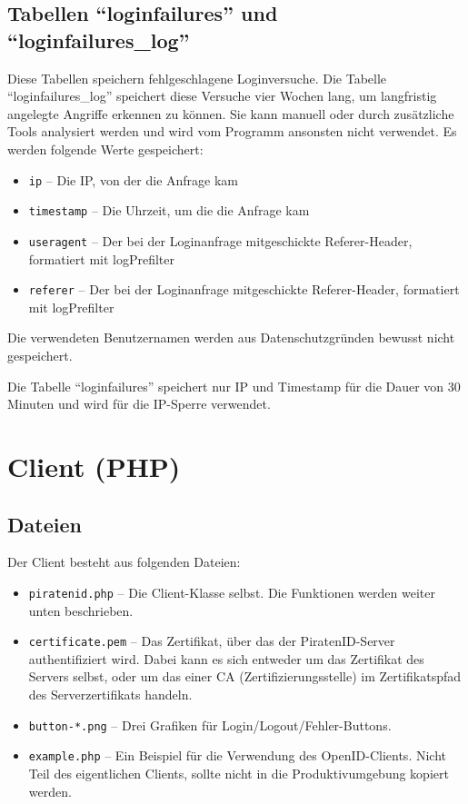 \subsection{Tabellen "`loginfailures"' und "`loginfailures\_log"'}
Diese Tabellen speichern fehlgeschlagene Loginversuche.
Die Tabelle "`loginfailures\_log"' speichert diese Versuche vier Wochen lang, um langfristig angelegte Angriffe erkennen zu können.
Sie kann manuell oder durch zusätzliche Tools analysiert werden und wird vom Programm ansonsten nicht verwendet.
Es werden folgende Werte gespeichert:
\begin{itemize}
	\item \texttt{ip} -- Die IP, von der die Anfrage kam
	\item \texttt{timestamp} -- Die Uhrzeit, um die die Anfrage kam
	\item \texttt{useragent} -- Der bei der Loginanfrage mitgeschickte Referer-Header, formatiert mit logPrefilter
	\item \texttt{referer} -- Der bei der Loginanfrage mitgeschickte Referer-Header, formatiert mit logPrefilter
\end{itemize}
Die verwendeten Benutzernamen werden aus Datenschutzgründen bewusst nicht gespeichert.

Die Tabelle "`loginfailures"' speichert nur IP und Timestamp für die Dauer von 30 Minuten und wird für die IP-Sperre verwendet.

\newpage
\section{Client (PHP)}


\subsection{Dateien}
Der Client besteht aus folgenden Dateien:
\begin{itemize}
	\item \texttt{piratenid.php} --
		Die Client-Klasse selbst. Die Funktionen werden weiter unten beschrieben.
	\item \texttt{certificate.pem} -- 
		Das Zertifikat, über das der PiratenID-Server authentifiziert wird.
		Dabei kann es sich entweder um das Zertifikat des Servers selbst,
		oder um das einer CA (Zertifizierungsstelle) im Zertifikatspfad des Serverzertifikats handeln.
	\item \texttt{button-*.png} --
		Drei Grafiken für Login/Logout/Fehler-Buttons.
	\item \texttt{example.php} --
		Ein Beispiel für die Verwendung des OpenID-Clients. Nicht Teil des eigentlichen Clients, sollte nicht in die Produktivumgebung kopiert werden.
\end{itemize}


